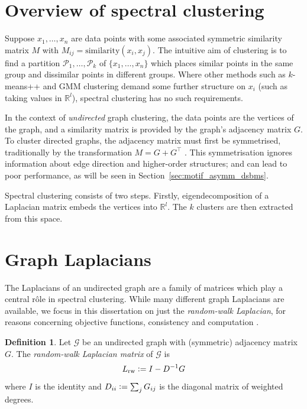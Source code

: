 \documentclass[12pt,draft]{ociamthesis}
\theoremstyle{plain}
\theoremstyle{definition}
\newtheorem{definition}{Definition}[chapter]
\theoremstyle{remark}
\newcommand\bb[1]{\mathbb{#1}}
\newcommand\ca[1]{\mathcal{#1}}
\begin{document}
\section{Overview of spectral clustering} \label{sec:spectral_overview}

Suppose $x_1, \ldots, x_n$ are data points with some associated symmetric
similarity matrix $M$ with ${M_{i j} = \mathrm{similarity}(x_i,x_j)}$.
The intuitive aim of clustering is to find a partition $\ca{P}_1, \ldots,
\ca{P}_k$ of $\{ x_1, \ldots, x_n \}$ which places similar points in the same
group and dissimilar points in different groups.
Where other methods such as $k$-means++  \cite{arthur2007k} and GMM clustering
\cite{duda1973pattern} demand some further structure on $x_i$ (such as taking
values in $\bb{R}^l$), spectral clustering has no such requirements.

In the context of \emph{undirected} graph clustering, the data points are the
vertices of the graph, and a similarity matrix is provided by the graph's
adjacency matrix $G$.
To cluster directed graphs, the adjacency matrix must first be symmetrised,
traditionally by the transformation $M = G + G^\top$
\cite{Meila2007ClusteringBW}.
This symmetrisation ignores information about edge direction and higher-order
structures; and can lead to poor performance, as will be seen in
Section~\ref{sec:motif_asymm_dsbms}.

Spectral clustering consists of two steps. Firstly, eigendecomposition of a
Laplacian matrix embeds the vertices into $\bb{R}^{l}$. The $k$ clusters are
then extracted from this space.

\section{Graph Laplacians} \label{sec:spectral_laplacians}

The Laplacians of an undirected graph are a family of matrices which play a
central r\^ole in spectral clustering. While many different graph Laplacians
are available, we focus in this dissertation on just the \emph{random-walk
Laplacian}, for reasons concerning objective functions, consistency and
computation \cite{von2007tutorial, luxburg2004convergence}.

\begin{definition}
  Let $\ca{G}$ be an undirected graph with (symmetric) adjacency matrix $G$. The
  \emph{random-walk Laplacian matrix} of $\ca{G}$ is
  $$ L_\mathrm{rw} \vcentcolon= I - D^{-1} G $$
  where $I$ is the identity and $D_{ii} \vcentcolon= \sum_j G_{i j}$ is the
  diagonal matrix of weighted degrees.
\end{definition}
\end{document}
